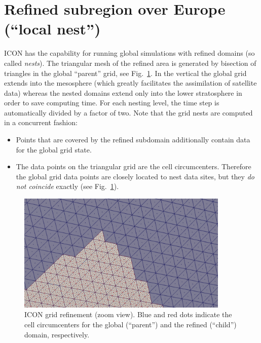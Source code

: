 \section{Refined subregion over Europe (``local nest'')}

ICON has the capability for running global simulations with refined
domains (so called \emph{nests}).
%
The triangular mesh of the refined area is generated by bisection of
triangles in the global ``parent'' grid, see
Fig.~\ref{fig:icon_grid_refinement_zoom_view}.
In the vertical the global grid extends into the mesosphere (which
greatly facilitates the assimilation of satellite data) whereas the
nested domains extend only into the lower stratosphere in order to
save computing time.
For each nesting level, the time step is automatically divided by a
factor of two.
%
Note that the grid nests are computed in a concurrent fashion:  
\begin{itemize}
\item Points that are covered by the refined subdomain additionally
  contain data for the global grid state.
\item The data points on the triangular grid are the cell
  circumcenters. Therefore the global grid data points are closely
  located to nest data sites, but they \emph{do not coincide} exactly 
  (see Fig.~\ref{fig:icon_grid_refinement_zoom_view}).
\end{itemize}


\begin{figure}[h]
  \centering
  \includegraphics[width=0.90\textwidth]{pics/grid_refinement.png}
  \caption{ICON grid refinement (zoom view). Blue and red dots indicate the cell circumcenters for the global (``parent'') and the refined (``child'') domain, respectively.}
  \label{fig:icon_grid_refinement_zoom_view}
\end{figure}

